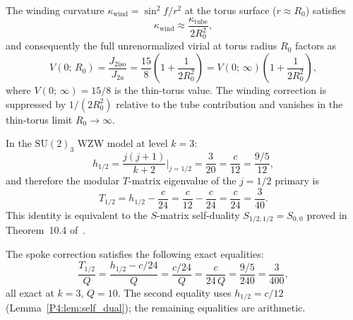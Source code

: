 \begin{lemma}
\label{P4:lem:virial_factor}
The winding curvature $\kappa_\mathrm{wind} = \sin^2\!f/r^2$ at the torus
surface ($r \approx R_0$) satisfies
\begin{equation}
  \kappa_\mathrm{wind} \approx \frac{\kappa_\mathrm{tube}}{2R_0^2},
  \label{P4:eq:kappa_wind_exact}
\end{equation}
and consequently the full unrenormalized virial at torus radius $R_0$ factors as
\begin{equation}
  V(0;\,R_0)
  = \frac{J_{2\mathrm{iso}}}{J_{2a}}
  = \frac{15}{8}\!\left(1 + \frac{1}{2R_0^2}\right)
  = V(0;\,\infty)\!\left(1 + \frac{1}{2R_0^2}\right),
  \label{P4:eq:virial_factor}
\end{equation}
where $V(0;\,\infty) = 15/8$ is the thin-torus value.
The winding correction is suppressed by $1/(2R_0^2)$ relative to the tube
contribution and vanishes in the thin-torus limit $R_0\to\infty$.
\end{lemma}

\begin{lemma}[Self-duality identity at $k=3$]
\label{P4:lem:self_dual}
In the $\mathrm{SU}(2)_3$ WZW model at level $k=3$:
\begin{equation}
  h_{1/2} = \frac{j(j+1)}{k+2}\bigg|_{j=1/2} = \frac{3}{20}
  = \frac{c}{12} = \frac{9/5}{12},
  \label{P4:eq:h12_c12}
\end{equation}
and therefore the modular $T$-matrix eigenvalue of the $j=1/2$ primary is
\begin{equation}
  T_{1/2}
  = h_{1/2} - \frac{c}{24}
  = \frac{c}{12} - \frac{c}{24}
  = \frac{c}{24}
  = \frac{3}{40}.
  \label{P4:eq:T12_val}
\end{equation}
This identity is equivalent to the $S$-matrix self-duality
$S_{1/2,1/2}=S_{0,0}$ proved in Theorem~10.4 of~\cite{Paper3}.
\end{lemma}

\begin{lemma}
\label{P4:lem:three_forms}
The spoke correction satisfies the following exact equalities:
\begin{equation}
  \frac{T_{1/2}}{Q}
  = \frac{h_{1/2}-c/24}{Q}
  = \frac{c/24}{Q}
  = \frac{c}{24\,Q}
  = \frac{9/5}{240}
  = \frac{3}{400},
  \label{P4:eq:three_forms}
\end{equation}
all exact at $k=3$, $Q=10$.  The second equality uses $h_{1/2}=c/12$
(Lemma~\ref{P4:lem:self_dual}); the remaining equalities are arithmetic.
\end{lemma}

